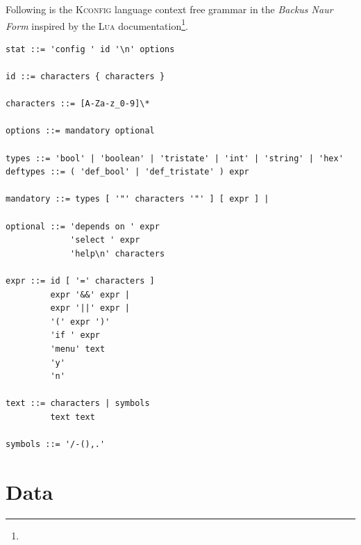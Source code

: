 \documentclass[a4paper,11pt]{report}
\newcommand{\f}{\footnote{\fn}}
\begin{document}
Following is the \textsc{Kconfig} language context free grammar in the 
\emph{Backus Naur Form} inspired by the \textsc{Lua} documentation\f.

\begin{verbatim}
stat ::= 'config ' id '\n' options

id ::= characters { characters }

characters ::= [A-Za-z_0-9]\*

options ::= mandatory optional

types ::= 'bool' | 'boolean' | 'tristate' | 'int' | 'string' | 'hex'
deftypes ::= ( 'def_bool' | 'def_tristate' ) expr

mandatory ::= types [ '"' characters '"' ] [ expr ] |

optional ::= 'depends on ' expr
             'select ' expr
             'help\n' characters

expr ::= id [ '=' characters ] 
         expr '&&' expr |
         expr '||' expr |
         '(' expr ')'
         'if ' expr
         'menu' text
         'y'
         'n'

text ::= characters | symbols 
         text text

symbols ::= '/-(),.'

\end{verbatim}


            \section{Data}
\end{document}
